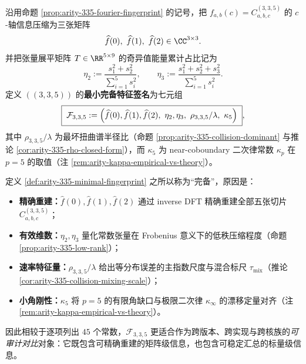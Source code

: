 \begin{definition}\label{def:arity-335-minimal-fingerprint}
沿用命题 \ref{prop:arity-335-fourier-fingerprint} 的记号，把 \(f_{a,b}(c)=C^{(3,3,5)}_{a,b,c}\) 的 \(c\)-轴信息压缩为三张矩阵
\[
\widehat f(0),\ \widehat f(1),\ \widehat f(2)\in\CC^{3\times 3}.
\]
并把张量展平矩阵 \(T\in\RR^{5\times 9}\) 的奇异值能量累计占比记为
\[
\eta_2:=\frac{s_1^2+s_2^2}{\sum_{i=1}^5 s_i^2},
\qquad
\eta_3:=\frac{s_1^2+s_2^2+s_3^2}{\sum_{i=1}^5 s_i^2}.
\]
定义 \(((3,3,5))\) 的\textbf{最小完备特征签名}为七元组
\[
\boxed{\;
\mathcal{F}_{3,3,5}:=
\Bigl(\widehat f(0),\widehat f(1),\widehat f(2),\ \eta_2,\eta_3,\ \rho_{3,3,5}/\lambda,\ \kappa_5\Bigr)\;},
\]
其中 \(\rho_{3,3,5}/\lambda\) 为最坏扭曲谱半径比（命题 \ref{prop:arity-335-collision-dominant} 与推论 \ref{cor:arity-335-rho-closed-form}），而 \(\kappa_5\) 为 near-coboundary 二次律常数 \(\kappa_p\) 在 \(p=5\) 的取值（注 \ref{rem:arity-kappa-empirical-vs-theory}）。
\end{definition}

\begin{remark}\label{rem:arity-335-minimal-fingerprint-complete}
定义 \ref{def:arity-335-minimal-fingerprint} 之所以称为“完备”，原因是：
\begin{itemize}
  \item \textbf{精确重建：}\(\widehat f(0),\widehat f(1),\widehat f(2)\) 通过 inverse DFT 精确重建全部五张切片 \(C^{(3,3,5)}_{a,b,c}\)；
  \item \textbf{有效维数：}\(\eta_2,\eta_3\) 量化常数张量在 Frobenius 意义下的低秩压缩程度（命题 \ref{prop:arity-335-low-rank}）；
  \item \textbf{速率特征量：}\(\rho_{3,3,5}/\lambda\) 给出等分布误差的主指数尺度与混合标尺 \(\tau_{\mathrm{mix}}\)（推论 \ref{cor:arity-335-collision-mixing-scale}）；
  \item \textbf{小角刚性：}\(\kappa_5\) 将 \(p=5\) 的有限角缺口与极限二次律 \(\kappa_\infty\) 的漂移定量对齐（注 \ref{rem:arity-kappa-empirical-vs-theory}）。
\end{itemize}
因此相较于逐项列出 \(45\) 个常数，\(\mathcal{F}_{3,3,5}\) 更适合作为跨版本、跨实现与跨核族的\emph{可审计对比}对象：它既包含可精确重建的矩阵级信息，也包含可稳定汇总的标量级信息。
\end{remark}


